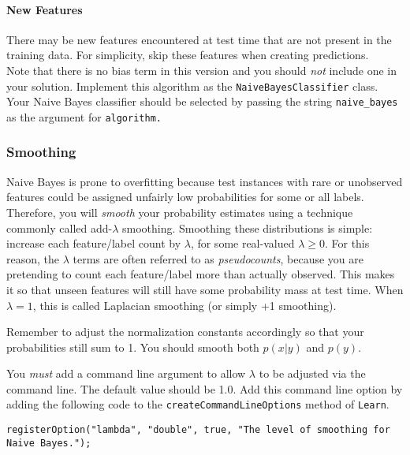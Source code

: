 \documentclass[11pt]{article}
\newcommand{\code}[1]{{\footnotesize \tt #1}}
\begin{document}
\paragraph{New Features} There may be new features encountered at test time that are not present in the training data. For simplicity, skip these features when creating predictions.\\


Note that there is no bias term in this version and you should
\emph{not} include one in your solution. Implement this algorithm as the \code{NaiveBayesClassifier} class. Your Naive Bayes classifier should be selected by passing the string {\tt naive\_bayes} as the argument for {\tt algorithm.} 

\subsubsection{Smoothing}

Naive Bayes is prone to overfitting because test instances with rare or unobserved features could be assigned unfairly low probabilities for some or all labels. 
Therefore, you will {\em smooth} your probability estimates using a technique commonly called add-$\lambda$ smoothing. Smoothing these distributions is simple: increase each feature/label count by $\lambda$, for some real-valued $\lambda \ge 0$. For this reason, the $\lambda$ terms are often referred to as {\em pseudocounts}, because you are pretending to count each feature/label more than actually observed. This makes it so that unseen features will still have some probability mass at test time.
When $\lambda=1$, this is called Laplacian smoothing (or simply +1 smoothing). 

Remember to adjust the normalization constants accordingly so that your probabilities still sum to 1. You should smooth both $p(x|y)$ and $p(y)$.



You {\em must} add a command line argument to allow $\lambda$ to be adjusted via the command line. The default value should be 1.0.
Add this command line option by adding the following code to the \code{createCommandLineOptions} method of \code{Learn}.
\begin{footnotesize}
\begin{verbatim}
registerOption("lambda", "double", true, "The level of smoothing for Naive Bayes.");
\end{verbatim}
\end{footnotesize}
\end{document}
